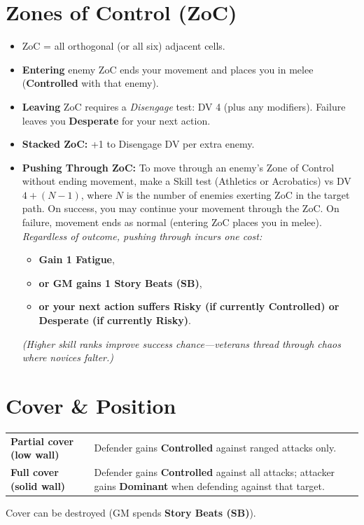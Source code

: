 \documentclass[12pt]{article}
\newcommand{\term}[1]{\textit{#1}}
\newcommand{\storybeats}{\textbf{Story Beats (SB)}}   %
\newcommand{\pos}[1]{\textbf{#1}}
\begin{document}
\section{Zones of Control (ZoC)}
\begin{itemize}[noitemsep]
    \item ZoC = all orthogonal (or all six) adjacent cells.
    \item \textbf{Entering} enemy ZoC ends your movement and places you in melee (\pos{Controlled} with that enemy).
    \item \textbf{Leaving} ZoC requires a \term{Disengage} test: DV 4 (plus any modifiers). Failure leaves you \pos{Desperate} for your next action.
    \item \textbf{Stacked ZoC:} +1 to Disengage DV per extra enemy.
    \item \textbf{Pushing Through ZoC:} To move through an enemy's Zone of Control without ending movement, make a Skill test (Athletics or Acrobatics) vs DV $4 + (N-1)$, where $N$ is the number of enemies exerting ZoC in the target path. On success, you may continue your movement through the ZoC. On failure, movement ends as normal (entering ZoC places you in melee). \textit{Regardless of outcome, pushing through incurs one cost:} 
    \begin{itemize}[noitemsep]
        \item \textbf{Gain 1 Fatigue},
        \item \textbf{or GM gains 1 \storybeats},
        \item \textbf{or your next action suffers \pos{Risky} (if currently \pos{Controlled}) or \pos{Desperate} (if currently \pos{Risky})}.
    \end{itemize}
    \hfill\textit{(Higher skill ranks improve success chance---veterans thread through chaos where novices falter.)}
\end{itemize}

\section{Cover \& Position}
\begin{tabular}{>{\bfseries}l l}
\hline
Partial cover (low wall)     & Defender gains \pos{Controlled} against ranged attacks only. \\
Full cover (solid wall)      & Defender gains \pos{Controlled} against all attacks; attacker gains \pos{Dominant} when defending against that target. \\
\hline
\end{tabular}
\noindent Cover can be destroyed (GM spends \storybeats).
\end{document}
